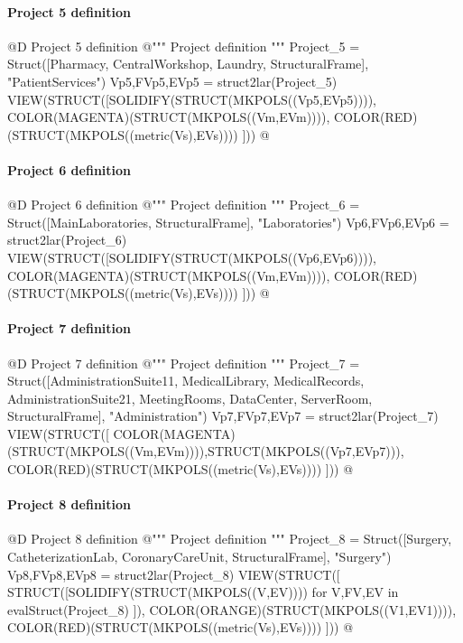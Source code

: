 \documentclass[11pt,oneside]{article}    %
\begin{document}
\paragraph{Project 5 definition}
@D Project 5 definition
@{""" Project definition """
Project_5 = Struct([Pharmacy, CentralWorkshop, Laundry, StructuralFrame], "PatientServices")
Vp5,FVp5,EVp5 = struct2lar(Project_5)
VIEW(STRUCT([SOLIDIFY(STRUCT(MKPOLS((Vp5,EVp5)))), COLOR(MAGENTA)(STRUCT(MKPOLS((Vm,EVm)))),
COLOR(RED)(STRUCT(MKPOLS((metric(Vs),EVs)))) ]))
@}

\paragraph{Project 6 definition}
@D Project 6 definition
@{""" Project definition """
Project_6 = Struct([MainLaboratories, StructuralFrame], "Laboratories")
Vp6,FVp6,EVp6 = struct2lar(Project_6)
VIEW(STRUCT([SOLIDIFY(STRUCT(MKPOLS((Vp6,EVp6)))), COLOR(MAGENTA)(STRUCT(MKPOLS((Vm,EVm)))),
COLOR(RED)(STRUCT(MKPOLS((metric(Vs),EVs)))) ]))
@}

\paragraph{Project 7 definition}
@D Project 7 definition
@{""" Project definition """
Project_7 = Struct([AdministrationSuite11, MedicalLibrary, MedicalRecords, 
			AdministrationSuite21, MeetingRooms, DataCenter, ServerRoom, StructuralFrame], 
			"Administration")
Vp7,FVp7,EVp7 = struct2lar(Project_7)
VIEW(STRUCT([ COLOR(MAGENTA)(STRUCT(MKPOLS((Vm,EVm)))),STRUCT(MKPOLS((Vp7,EVp7))),
COLOR(RED)(STRUCT(MKPOLS((metric(Vs),EVs)))) ]))
@}

\paragraph{Project 8 definition}
@D Project 8 definition
@{""" Project definition """
Project_8 = Struct([Surgery, CatheterizationLab, CoronaryCareUnit, StructuralFrame], 
					"Surgery")
Vp8,FVp8,EVp8 = struct2lar(Project_8)
VIEW(STRUCT([ STRUCT([SOLIDIFY(STRUCT(MKPOLS((V,EV)))) for V,FV,EV in evalStruct(Project_8) ]), 
	COLOR(ORANGE)(STRUCT(MKPOLS((V1,EV1)))), COLOR(RED)(STRUCT(MKPOLS((metric(Vs),EVs)))) ]))
@}
\end{document}
